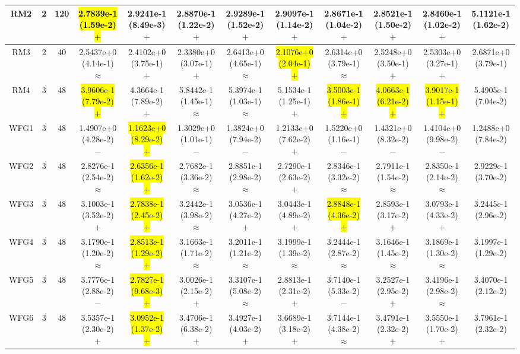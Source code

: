 \documentclass[journal]{IEEEtran}
\begin{document}
\begin{table*}[htbp]
\begin{tabular}{cccccccccccc}
\hline
\multirow{1}{*}{RM2}&2&120&\hl{2.7839e-1 (1.59e-2) $+$}&2.9241e-1 (8.49e-3) $+$&2.8870e-1 (1.22e-2) $+$&2.9289e-1 (1.52e-2) $+$&2.9097e-1 (1.14e-2) $+$&2.8671e-1 (1.04e-2) $+$&2.8521e-1 (1.50e-2) $+$&2.8460e-1 (1.02e-2) $+$&5.1121e-1 (1.62e-2)\\
\hline
\multirow{1}{*}{RM3}&2&40&2.5437e+0 (4.14e-1) $\approx$&2.4102e+0 (3.75e-1) $+$&2.3380e+0 (3.07e-1) $+$&2.6413e+0 (4.65e-1) $\approx$&\hl{2.1076e+0 (2.04e-1) $+$}&2.6314e+0 (3.79e-1) $\approx$&2.5248e+0 (3.50e-1) $+$&2.5303e+0 (3.27e-1) $+$&2.6871e+0 (3.79e-1)\\
\hline
\multirow{1}{*}{RM4}&3&48&\hl{3.9606e-1 (7.79e-2) $+$}&4.3664e-1 (7.89e-2) $+$&5.8442e-1 (1.45e-1) $\approx$&5.3974e-1 (1.03e-1) $\approx$&5.1534e-1 (1.25e-1) $+$&\hl{3.5003e-1 (1.86e-1) $+$}&\hl{4.0663e-1 (6.21e-2) $+$}&\hl{3.9017e-1 (1.15e-1) $+$}&5.4905e-1 (7.04e-2)\\
\hline
\multirow{1}{*}{WFG1}&3&48&1.4907e+0 (4.28e-2) $-$&\hl{1.1623e+0 (8.29e-2) $+$}&1.3029e+0 (1.01e-1) $-$&1.3824e+0 (7.94e-2) $-$&1.2133e+0 (7.62e-2) $+$&1.5220e+0 (1.16e-1) $-$&1.4321e+0 (8.32e-2) $-$&1.4104e+0 (9.98e-2) $-$&1.2488e+0 (7.84e-2)\\
\hline
\multirow{1}{*}{WFG2}&3&48&2.8276e-1 (2.54e-2) $\approx$&\hl{2.6356e-1 (1.62e-2) $+$}&2.7682e-1 (3.36e-2) $\approx$&2.8851e-1 (2.98e-2) $\approx$&2.7290e-1 (2.63e-2) $+$&2.8346e-1 (3.32e-2) $\approx$&2.7911e-1 (1.54e-2) $\approx$&2.8350e-1 (2.14e-2) $\approx$&2.9229e-1 (3.70e-2)\\
\hline
\multirow{1}{*}{WFG3}&3&48&3.1003e-1 (3.52e-2) $+$&\hl{2.7838e-1 (2.45e-2) $+$}&3.2442e-1 (3.98e-2) $\approx$&3.0536e-1 (4.27e-2) $+$&3.0443e-1 (4.89e-2) $+$&\hl{2.8848e-1 (4.36e-2) $+$}&2.8593e-1 (3.17e-2) $+$&3.0793e-1 (4.33e-2) $+$&3.2445e-1 (2.96e-2)\\
\hline
\multirow{1}{*}{WFG4}&3&48&3.1790e-1 (1.20e-2) $\approx$&\hl{2.8513e-1 (1.29e-2) $+$}&3.1663e-1 (1.71e-2) $\approx$&3.2011e-1 (1.21e-2) $\approx$&3.1999e-1 (1.39e-2) $\approx$&3.2444e-1 (2.87e-2) $\approx$&3.1646e-1 (1.45e-2) $\approx$&3.1869e-1 (1.30e-2) $\approx$&3.1997e-1 (1.29e-2)\\
\hline
\multirow{1}{*}{WFG5}&3&48&3.7776e-1 (2.88e-2) $-$&\hl{2.7827e-1 (9.68e-3) $+$}&3.0026e-1 (2.15e-2) $+$&3.3107e-1 (5.08e-2) $\approx$&2.8813e-1 (2.31e-2) $+$&3.7140e-1 (5.33e-2) $-$&3.2527e-1 (2.95e-2) $+$&3.4196e-1 (2.98e-2) $\approx$&3.4070e-1 (2.12e-2)\\
\hline
\multirow{1}{*}{WFG6}&3&48&3.5357e-1 (2.30e-2) $+$&\hl{3.0952e-1 (1.37e-2) $+$}&3.4706e-1 (6.38e-2) $+$&3.4927e-1 (4.03e-2) $+$&3.6689e-1 (3.18e-2) $+$&3.7144e-1 (4.38e-2) $\approx$&3.4791e-1 (2.32e-2) $+$&3.5550e-1 (1.70e-2) $+$&3.7961e-1 (2.32e-2)\\

\end{tabular}
\end{table*}
\end{document}
